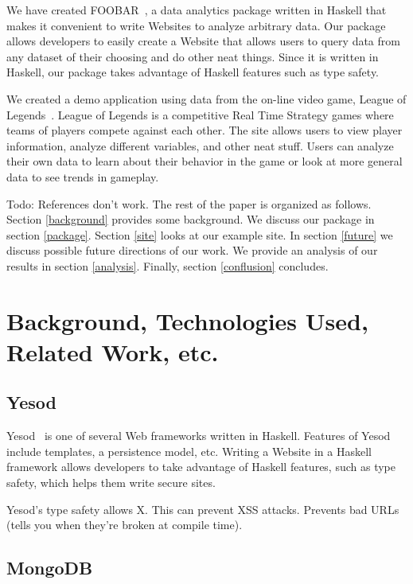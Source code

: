 \documentclass{chi2009}
\begin{document}
We have created FOOBAR~\cite{foobar}, a data analytics package written in Haskell that makes it convenient to write Websites to analyze arbitrary data. Our package allows developers to easily create a Website that allows users to query data from any dataset of their choosing and do other neat things. Since it is written in Haskell, our package takes advantage of Haskell features such as type safety. 

We created  a demo application using data from the on-line video game, League of Legends~\cite{lol}. League of Legends is a competitive Real Time Strategy games where teams of players compete against each other. The site allows users to view player information, analyze different variables, and other neat stuff. Users can analyze their own data to learn about their behavior in the game or look at more general data to see trends in gameplay. 

Todo: References don't work.
The rest of the paper is organized as follows. Section \ref{background} provides some background. We discuss our package in section \ref{package}. Section \ref{site} looks at our example site. In section \ref{future} we discuss possible future directions of our work. We provide an analysis of our results in section \ref{analysis}. Finally, section \ref{conflusion} concludes.

\section{Background, Technologies Used, Related Work, etc.}
\label{sec:background}

\subsection{Yesod}

Yesod~\cite{yesod} is one of several Web frameworks written in Haskell. Features of Yesod include templates, a persistence model, etc. Writing a Website in a Haskell framework allows developers to take advantage of Haskell features, such as type safety, which helps them write secure sites.

Yesod's type safety allows X. This can prevent XSS attacks. Prevents bad URLs (tells you when they're broken at compile time).

\subsection{MongoDB}
\end{document}
